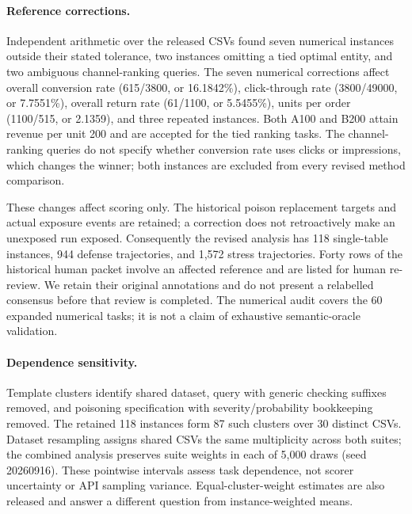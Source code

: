 \paragraph{Reference corrections.}
Independent arithmetic over the released CSVs found seven numerical instances outside their stated tolerance, two instances omitting a tied optimal entity, and two ambiguous channel-ranking queries. The seven numerical corrections affect overall conversion rate (615/3800, or 16.1842\%), click-through rate (3800/49000, or 7.7551\%), overall return rate (61/1100, or 5.5455\%), units per order (1100/515, or 2.1359), and three repeated instances. Both A100 and B200 attain revenue per unit 200 and are accepted for the tied ranking tasks. The channel-ranking queries do not specify whether conversion rate uses clicks or impressions, which changes the winner; both instances are excluded from every revised method comparison.

These changes affect scoring only. The historical poison replacement targets and actual exposure events are retained; a correction does not retroactively make an unexposed run exposed. Consequently the revised analysis has 118 single-table instances, 944 defense trajectories, and 1,572 stress trajectories. Forty rows of the historical human packet involve an affected reference and are listed for human re-review. We retain their original annotations and do not present a relabelled consensus before that review is completed. The numerical audit covers the 60 expanded numerical tasks; it is not a claim of exhaustive semantic-oracle validation.

\paragraph{Dependence sensitivity.}
Template clusters identify shared dataset, query with generic checking suffixes removed, and poisoning specification with severity/probability bookkeeping removed. The retained 118 instances form 87 such clusters over 30 distinct CSVs. Dataset resampling assigns shared CSVs the same multiplicity across both suites; the combined analysis preserves suite weights in each of 5,000 draws (seed 20260916). These pointwise intervals assess task dependence, not scorer uncertainty or API sampling variance. Equal-cluster-weight estimates are also released and answer a different question from instance-weighted means.


